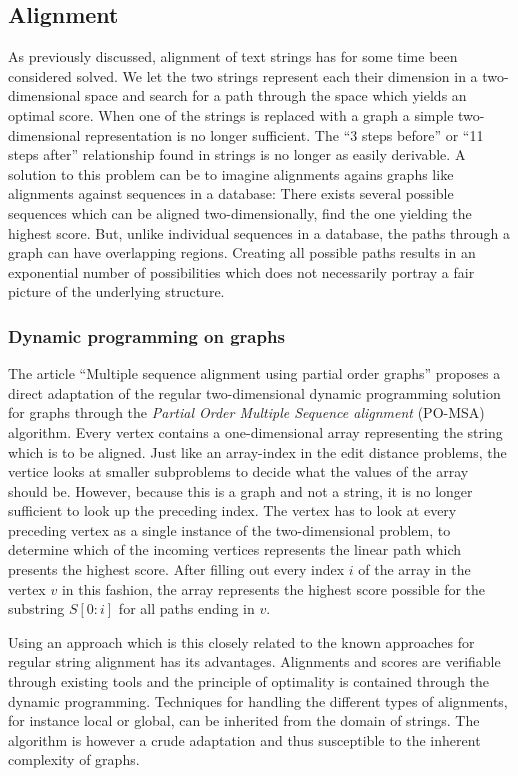 \documentclass[thesis.tex]{subfiles}
\begin{document}
\subsection{Alignment}
As previously discussed, alignment of text strings has for some time been considered solved. We let the two strings represent each their dimension in a two-dimensional space and search for a path through the space which yields an optimal score. When one of the strings is replaced with a graph a simple two-dimensional representation is no longer sufficient. The ``3 steps before'' or ``11 steps after'' relationship found in strings is no longer as easily derivable. A solution to this problem can be to imagine alignments agains graphs like alignments against sequences in a database: There exists several possible sequences which can be aligned two-dimensionally, find the one yielding the highest score. But, unlike individual sequences in a database, the paths through a graph can have overlapping regions. Creating all possible paths results in an exponential number of possibilities which does not necessarily portray a fair picture of the underlying structure.
\subsubsection{Dynamic programming on graphs}
\label{sec:dp_on_graphs}
The article ``Multiple sequence alignment using partial order graphs''\cite{multiple_sequence_alignment_using_partial_order_graphs} proposes a direct adaptation of the regular two-dimensional dynamic programming solution for graphs through the \textit{Partial Order Multiple Sequence alignment} (PO-MSA) algorithm. Every vertex contains a one-dimensional array representing the string which is to be aligned. Just like an array-index in the edit distance problems, the vertice looks at smaller subproblems to decide what the values of the array should be. However, because this is a graph and not a string, it is no longer sufficient to look up the preceding index. The vertex has to look at every preceding vertex as a single instance of the two-dimensional problem, to determine which of the incoming vertices represents the linear path which presents the highest score. After filling out every index $i$ of the array in the vertex $v$ in this fashion, the array represents the highest score possible for the substring $S[0:i]$ for all paths ending in $v$.\\
\par\noindent
Using an approach which is this closely related to the known approaches for regular string alignment has its advantages. Alignments and scores are verifiable through existing tools and the principle of optimality is contained through the dynamic programming. Techniques for handling the different types of alignments, for instance local or global, can be inherited from the domain of strings. The algorithm is however a crude adaptation and thus susceptible to the inherent complexity of graphs.
\label{sec:po_msa}
\end{document}
